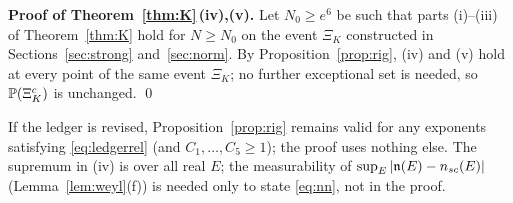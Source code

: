 \medskip\noindent\textbf{Proof of Theorem~\ref{thm:K}\,(iv),(v).} Let $N_0\ge e^6$ be such that parts (i)--(iii) of Theorem~\ref{thm:K} hold for $N\ge N_0$ on the event $\Xi_K$ constructed in Sections~\ref{sec:strong} and~\ref{sec:norm}.
By Proposition~\ref{prop:rig}, (iv) and (v) hold at every point of the same event $\Xi_K$; no further exceptional set is needed, so $\mathbb{P}(\Xi_K^c)$ is unchanged. \qed

\begin{remark}\label{rem:rigexp}
If the ledger is revised, Proposition~\ref{prop:rig} remains valid for any exponents satisfying \eqref{eq:ledgerrel} (and $C_1,\dots,C_5\ge1$); the proof uses nothing else.
The supremum in \textup{(iv)} is over all real $E$; the measurability of $\sup_E|\mathfrak{n}(E)-n_{sc}(E)|$ (Lemma~\ref{lem:weyl}(f)) is needed only to state \eqref{eq:nn}, not in the proof.
\end{remark}

